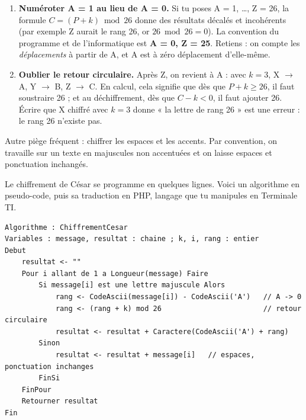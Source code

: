 \documentclass[11pt]{article}
\newcounter{popsec}
\newcounter{popsub}
\newcommand{\courssub}[1]{%
  \stepcounter{popsub}%
  \par\vspace{9pt}\noindent{\popxbold\fontsize{11.5}{13}\selectfont\color{popink}{\color{poporange}\thepopsec.\thepopsub}\hspace{6pt}#1}\par\nopagebreak\vspace{4pt}
}
\begin{document}
\begin{attention}
\begin{enumerate}
  \item \textbf{Numéroter A = 1 au lieu de A = 0.} Si tu poses A = 1, \dots, Z = 26, la formule $C = (P + k) \bmod 26$ donne des résultats décalés et incohérents (par exemple Z aurait le rang 26, or $26 \bmod 26 = 0$). La convention du programme et de l'informatique est \textbf{A = 0, Z = 25}. Retiens : on compte les \emph{déplacements} à partir de A, et A est à zéro déplacement d'elle-même.
  \item \textbf{Oublier le retour circulaire.} Après Z, on revient à A : avec $k = 3$, X $\rightarrow$ A, Y $\rightarrow$ B, Z $\rightarrow$ C. En calcul, cela signifie que dès que $P + k \ge 26$, il faut soustraire 26 ; et au déchiffrement, dès que $C - k < 0$, il faut ajouter 26. Écrire que X chiffré avec $k = 3$ donne « la lettre de rang 26 » est une erreur : le rang 26 n'existe pas.
\end{enumerate}
Autre piège fréquent : chiffrer les espaces et les accents. Par convention, on travaille sur un texte en majuscules non accentuées et on laisse espaces et ponctuation inchangés.
\end{attention}

\courssub{Mise en œuvre algorithmique}

Le chiffrement de César se programme en quelques lignes. Voici un algorithme en pseudo-code, puis sa traduction en PHP, langage que tu manipules en Terminale TI.

\begin{lstlisting}
Algorithme : ChiffrementCesar
Variables : message, resultat : chaine ; k, i, rang : entier
Debut
    resultat <- ""
    Pour i allant de 1 a Longueur(message) Faire
        Si message[i] est une lettre majuscule Alors
            rang <- CodeAscii(message[i]) - CodeAscii('A')   // A -> 0
            rang <- (rang + k) mod 26                        // retour circulaire
            resultat <- resultat + Caractere(CodeAscii('A') + rang)
        Sinon
            resultat <- resultat + message[i]   // espaces, ponctuation inchanges
        FinSi
    FinPour
    Retourner resultat
Fin
\end{lstlisting}
\end{document}
